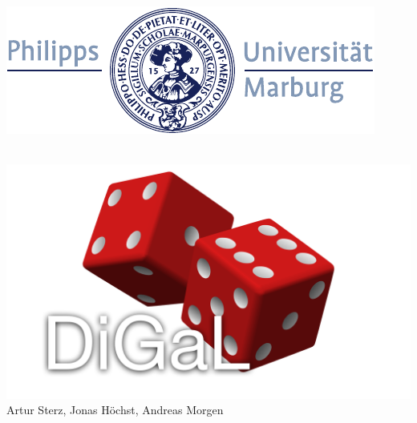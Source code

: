 \documentclass[a4paper, oneside]{book}
\begin{document}
	\begin{titlepage}
        \raggedright
        \includegraphics[width=.5\textwidth,right]{siegel.pdf}
        \begin{center}
            ~\\[2cm]
            \includegraphics[width=\textwidth]{Logo.pdf}
		    \Large{Artur Sterz, Jonas Höchst, Andreas Morgen}

        \end{center}
	\end{titlepage}
	\tableofcontents
	\newpage










	
\end{document}
